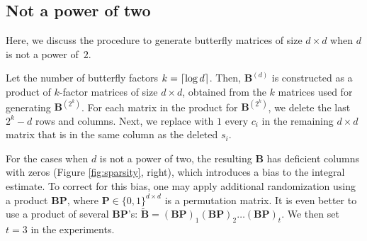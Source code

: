 \subsection{Not a power of two}
\label{appendix:butterflies_not_power_of_two}
Here, we discuss the procedure to generate butterfly matrices of size $d \times d$ when $d$ is not a power of~$2$.

Let the number of butterfly factors $k = \lceil\log d\rceil$. Then, $\mathbf{B}^{(d)}$ is constructed as a product of $k$-factor matrices of size $d \times d$, obtained from the $k$ matrices used for generating $\mathbf{B}^{(2^k)}$. For each matrix in the product for $\mathbf{B}^{(2^k)}$, we delete the last $2^k - d$ rows and columns. Next, we replace with $1$ every $c_i$ in the remaining $d \times d$ matrix that is in the same column as the deleted $s_i$.

For the cases when $d$ is not a power of two, the resulting $\mathbf{B}$ has deficient columns with zeros (Figure \ref{fig:sparsity}, right), which introduces a bias to the integral estimate. To correct for this bias, one may apply additional randomization using a product $\mathbf{BP}$, where $\mathbf{P} \in \{0,1\}^{d \times d}$ is a permutation matrix. It is even better to use a product of several $\mathbf{BP}$'s: $\mathbf{\widetilde{B}} = (\mathbf{BP})_1 (\mathbf{BP})_2 \dots (\mathbf{BP})_t$. We then set $t=3$ in the experiments.

